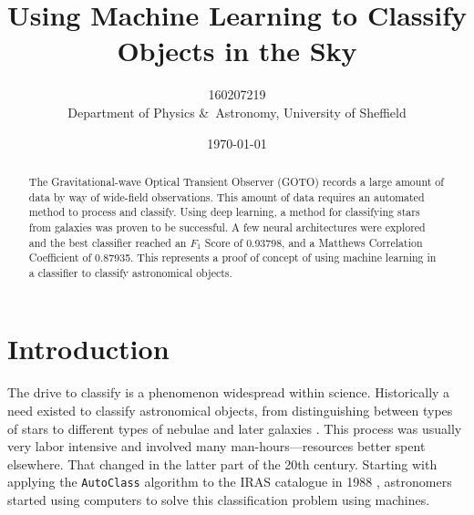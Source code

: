 \documentclass[a4paper,fleqn,usenatbib]{mnras}
\title[Machine Learning Astronomical Classification]{Using Machine Learning to Classify Objects in the Sky}
\author[160207219]{160207219
\\
Department of Physics \&\ Astronomy, University of Sheffield}
\date{\today}
\begin{document}
\label{firstpage}
\pagerange{\pageref{firstpage}--\pageref{lastpage}}
\maketitle

\begin{abstract}
The Gravitational-wave Optical Transient Observer (GOTO) records a large amount of data by way of wide-field observations. This amount of data requires an automated method to process and classify. Using deep learning, a method for classifying stars from galaxies was proven to be successful. A few neural architectures were explored and the best classifier reached an $F_1$ Score of 0.93798, and a Matthews Correlation Coefficient of 0.87935. This represents a proof of concept of using machine learning in a classifier to classify astronomical objects. 
\end{abstract}







\section{Introduction}
\label{sec:introduction}

The drive to classify is a phenomenon widespread within science. Historically a need existed to classify astronomical objects, from distinguishing between types of stars \citep{HarvardClassification} to different types of nebulae \citep{Nebulae} and later galaxies \citep{Hubble}. This process was usually very labor intensive and involved many man-hours---resources better spent elsewhere. That changed in the latter part of the 20th century. Starting with applying the \texttt{AutoClass} algorithm to the IRAS catalogue in 1988 \citep{adorf_1988_supervised}, astronomers started using computers to solve this classification problem using machines.
\end{document}
